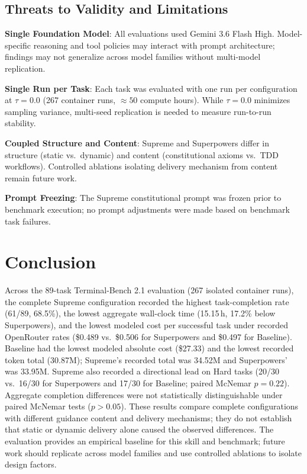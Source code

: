 \subsection{Threats to Validity and Limitations}
\textbf{Single Foundation Model}: All evaluations used Gemini 3.6 Flash High. Model-specific reasoning and tool policies may interact with prompt architecture; findings may not generalize across model families without multi-model replication.
\par\textbf{Single Run per Task}: Each task was evaluated with one run per configuration at $\tau=0.0$ (267 container runs, $\approx 50$ compute hours). While $\tau=0.0$ minimizes sampling variance, multi-seed replication is needed to measure run-to-run stability.
\par\textbf{Coupled Structure and Content}: Supreme and Superpowers differ in structure (static vs.\ dynamic) and content (constitutional axioms vs.\ TDD workflows). Controlled ablations isolating delivery mechanism from content remain future work.
\par\textbf{Prompt Freezing}: The Supreme constitutional prompt was frozen prior to benchmark execution; no prompt adjustments were made based on benchmark task failures.

\vspace{-0.3em}
\section{Conclusion}
\label{sec:conclusion}
Across the 89-task Terminal-Bench 2.1 evaluation (267 isolated container runs), the complete Supreme configuration recorded the highest task-completion rate (61/89, 68.5\%), the lowest aggregate wall-clock time (15.15\,h, 17.2\% below Superpowers), and the lowest modeled cost per successful task under recorded OpenRouter rates (\$0.489 vs.\ \$0.506 for Superpowers and \$0.497 for Baseline). Baseline had the lowest modeled absolute cost (\$27.33) and the lowest recorded token total (30.87M); Supreme's recorded total was 34.52M and Superpowers' was 33.95M. Supreme also recorded a directional lead on Hard tasks (20/30 vs.\ 16/30 for Superpowers and 17/30 for Baseline; paired McNemar $p = 0.22$). Aggregate completion differences were not statistically distinguishable under paired McNemar tests ($p > 0.05$). These results compare complete configurations with different guidance content and delivery mechanisms; they do not establish that static or dynamic delivery alone caused the observed differences. The evaluation provides an empirical baseline for this skill and benchmark; future work should replicate across model families and use controlled ablations to isolate design factors.

